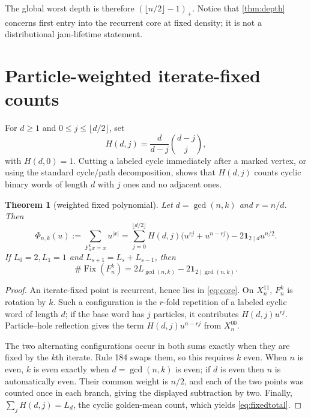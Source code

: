 \documentclass[11pt,a4paper]{amsart}
\newtheorem{theorem}{Theorem}[section]
\theoremstyle{definition}
\theoremstyle{remark}
\newcommand{\Fix}{\operatorname{Fix}}
\newcommand{\1}{\mathbf 1}
\begin{document}
The global worst depth is therefore $(\lfloor n/2\rfloor-1)_+$.  Notice that
\cref{thm:depth} concerns first entry into the recurrent core at fixed density;
it is not a distributional jam-lifetime statement.

\section{Particle-weighted iterate-fixed counts}

For $d\geq1$ and $0\leq j\leq\lfloor d/2\rfloor$, set
\begin{equation}\label{eq:H}
 H(d,j)=\frac d{d-j}\binom{d-j}{j},
\end{equation}
with $H(d,0)=1$.  Cutting a labeled cycle immediately after a marked vertex,
or using the standard cycle/path decomposition, shows that $H(d,j)$ counts
cyclic binary words of length $d$ with $j$ ones and no adjacent ones.

\begin{theorem}[weighted fixed polynomial]\label{thm:fixed}
Let $d=\gcd(n,k)$ and $r=n/d$.  Then
\begin{equation}\label{eq:fixedpoly}
 \Phi_{n,k}(u):=\sum_{F_n^kx=x}u^{|x|}
 =\sum_{j=0}^{\lfloor d/2\rfloor}H(d,j)
   \bigl(u^{rj}+u^{n-rj}\bigr)
   -2\1_{2\mid d}u^{n/2}.
\end{equation}
If $L_0=2,L_1=1$ and $L_{s+1}=L_s+L_{s-1}$, then
\begin{equation}\label{eq:fixedtotal}
 \#\Fix(F_n^k)=2L_{\gcd(n,k)}-2\1_{2\mid\gcd(n,k)}.
\end{equation}
\end{theorem}

\begin{proof}
An iterate-fixed point is recurrent, hence lies in \eqref{eq:core}.  On
$X_n^{11}$, $F_n^k$ is rotation by $k$.  Such a configuration is the
$r$-fold repetition of a labeled cyclic word of length $d$; if the base word
has $j$ particles, it contributes $H(d,j)u^{rj}$.  Particle--hole reflection
gives the term $H(d,j)u^{n-rj}$ from $X_n^{00}$.

The two alternating configurations occur in both sums exactly when they are
fixed by the $k$th iterate.  Rule 184 swaps them, so this requires $k$ even.
When $n$ is even, $k$ is even exactly when $d=\gcd(n,k)$ is even; if $d$ is
even then $n$ is automatically even.  Their common weight is $n/2$, and
each of the two points was counted once in each branch, giving the displayed
subtraction by two.  Finally,
$\sum_jH(d,j)=L_d$, the cyclic golden-mean count, which yields
\eqref{eq:fixedtotal}.
\end{proof}
\end{document}
